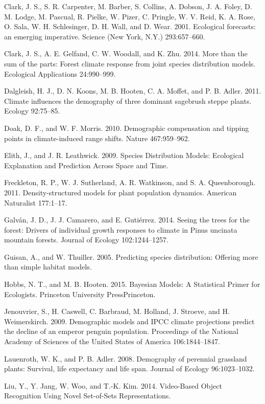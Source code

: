 \documentclass[12pt,]{article}
\begin{document}
Clark, J. S., S. R. Carpenter, M. Barber, S. Collins, A. Dobson, J. A.
Foley, D. M. Lodge, M. Pascual, R. Pielke, W. Pizer, C. Pringle, W. V.
Reid, K. A. Rose, O. Sala, W. H. Schlesinger, D. H. Wall, and D. Wear.
2001. Ecological forecasts: an emerging imperative. Science (New York,
N.Y.) 293:657--660.

Clark, J. S., A. E. Gelfand, C. W. Woodall, and K. Zhu. 2014. More than
the sum of the parts: Forest climate response from joint species
distribution models. Ecological Applications 24:990--999.

Dalgleish, H. J., D. N. Koons, M. B. Hooten, C. A. Moffet, and P. B.
Adler. 2011. Climate influences the demography of three dominant
sagebrush steppe plants. Ecology 92:75--85.

Doak, D. F., and W. F. Morris. 2010. Demographic compensation and
tipping points in climate-induced range shifts. Nature 467:959--962.

Elith, J., and J. R. Leathwick. 2009. Species Distribution Models:
Ecological Explanation and Prediction Across Space and Time.

Freckleton, R. P., W. J. Sutherland, A. R. Watkinson, and S. A.
Queenborough. 2011. Density-structured models for plant population
dynamics. American Naturalist 177:1--17.

Galván, J. D., J. J. Camarero, and E. Gutiérrez. 2014. Seeing the trees
for the forest: Drivers of individual growth responses to climate in
Pinus uncinata mountain forests. Journal of Ecology 102:1244--1257.

Guisan, A., and W. Thuiller. 2005. Predicting species distribution:
Offering more than simple habitat models.

Hobbs, N. T., and M. B. Hooten. 2015. Bayesian Models: A Statistical
Primer for Ecologists. Princeton University PressPrinceton.

Jenouvrier, S., H. Caswell, C. Barbraud, M. Holland, J. Stroeve, and H.
Weimerskirch. 2009. Demographic models and IPCC climate projections
predict the decline of an emperor penguin population. Proceedings of the
National Academy of Sciences of the United States of America
106:1844--1847.

Lauenroth, W. K., and P. B. Adler. 2008. Demography of perennial
grassland plants: Survival, life expectancy and life span. Journal of
Ecology 96:1023--1032.

Liu, Y., Y. Jang, W. Woo, and T.-K. Kim. 2014. Video-Based Object
Recognition Using Novel Set-of-Sets Representations.
\end{document}

